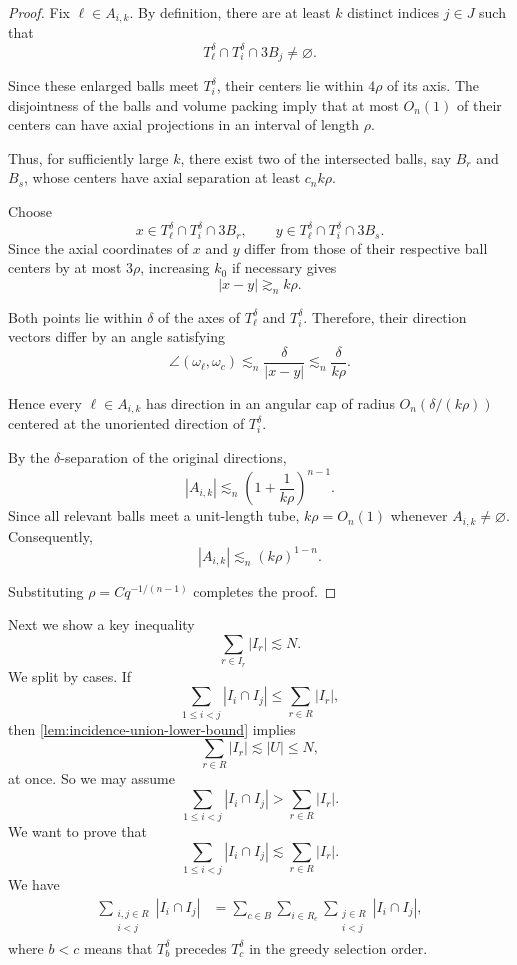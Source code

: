 \documentclass[11pt, letterpaper]{nyjm}
\begin{document}
	 \begin{proof}
	 	Fix \(\ell\in A_{i,k}\). By definition,
	 	there are at least \(k\) distinct
	 	indices \(j\in J\) such that
	 	\[
	 	T_\ell^\delta\cap T_i^\delta
	 	\cap 3B_j\ne\varnothing.
	 	\]
	 	
	 	Since these enlarged balls meet
	 	\(T_i^\delta\), their centers lie
	 	within \(4\rho\) of its axis.
	 	The disjointness of the balls and
	 	volume packing imply that at most
	 	\(O_n(1)\) of their centers can have
	 	axial projections in an interval
	 	of length \(\rho\).
	 	
	 	Thus, for sufficiently large \(k\),
	 	there exist two of the intersected
	 	balls, say \(B_r\) and \(B_s\), whose
	 	centers have axial separation at least
	 	\(c_n k\rho\).
	 	
	 	Choose
	 	\[
	 	x\in T_\ell^\delta\cap T_i^\delta
	 	\cap 3B_r,
	 	\qquad
	 	y\in T_\ell^\delta\cap T_i^\delta
	 	\cap 3B_s.
	 	\]
	 	Since the axial coordinates of \(x\)
	 	and \(y\) differ from those of their
	 	respective ball centers by at most
	 	\(3\rho\), increasing \(k_0\) if
	 	necessary gives
	 	\[
	 	|x-y|\gtrsim_n k\rho.
	 	\]
	 	
	 	Both points lie within \(\delta\)
	 	of the axes of \(T_\ell^\delta\)
	 	and \(T_i^\delta\). Therefore, their
	 	direction vectors differ by an angle
	 	satisfying
	 	\[
	 	\angle(\omega_\ell,\omega_c)
	 	\lesssim_n\frac{\delta}{|x-y|}
	 	\lesssim_n\frac{\delta}{k\rho}.
	 	\]
	 	
	 	Hence every \(\ell\in A_{i,k}\) has
	 	direction in an angular cap of radius
	 	\(O_n(\delta/(k\rho))\) centered at
	 	the unoriented direction of
	 	\(T_i^\delta\).
	 	
	 	By the \(\delta\)-separation of the
	 	original directions,
	 	\[
	 	|A_{i,k}|
	 	\lesssim_n
	 	\left(1+\frac1{k\rho}\right)^{n-1}.
	 	\]
	 	Since all relevant balls meet a
	 	unit-length tube, \(k\rho=O_n(1)\)
	 	whenever \(A_{i,k}\ne\varnothing\).
	 	Consequently,
	 	\[
	 	|A_{i,k}|
	 	\lesssim_n (k\rho)^{1-n}.
	 	\]
	 	
	 	Substituting
	 	\(\rho=Cq^{-1/(n-1)}\) completes
	 	the proof.
	 \end{proof}
	 

Next we show a key inequality
\begin{equation} \label{eq:key-bound}
	\sum_{r \in I_r}|I_r| \lesssim N.
\end{equation}
We split by cases. 
If
\[
\sum_{1\leq i < j} |I_i \cap I_j| \leq \sum_{r\in R}|I_r|, 
\]
then 
\ref{lem:incidence-union-lower-bound} implies 
\[
\sum_{r\in R}|I_r| \lesssim |U| \leq N, 
\]
at once.
So we may assume
\[
\sum_{1\leq i < j} |I_i \cap I_j| > \sum_{r\in R}|I_r|. 
\]
We want to prove that 
\[
\sum_{1\leq i < j} |I_i \cap I_j| \lesssim \sum_{r\in R}|I_r|. 
\]
We have
\begin{align*}
	\sum_{\substack{i,j\in R\\ i<j}} |I_i\cap I_j|
	&=
	\sum_{c \in B}\sum_{i\in R_c}\sum_{\substack{j\in R\\ i <j}} |I_i\cap I_j|
	,
\end{align*}
where $b<c$ means that $T_b^\delta$ precedes $T_c^\delta$ in the greedy
selection order.
\end{document}
